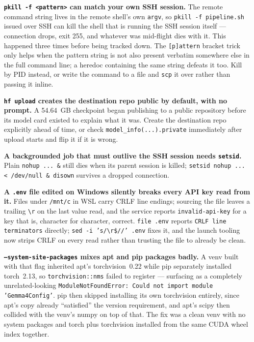 \documentclass[11pt]{article}
\begin{document}
\textbf{\texttt{pkill -f <pattern>} can match your own SSH session.} The remote
command string lives in the remote shell's own \texttt{argv}, so \texttt{pkill -f
pipeline.sh} issued over SSH can kill the shell that is running the SSH session itself
--- connection drops, exit 255, and whatever was mid-flight dies with it. This happened
three times before being tracked down. The \texttt{[p]attern} bracket trick only helps
when the pattern string is not also present verbatim somewhere else in the full command
line; a heredoc containing the same string defeats it too. Kill by PID instead, or write
the command to a file and \texttt{scp} it over rather than passing it inline.

\textbf{\texttt{hf upload} creates the destination repo public by default, with no
prompt.} A 54.64~GB checkpoint began publishing to a public repository before its model
card existed to explain what it was. Create the destination repo explicitly ahead of
time, or check \texttt{model\_info(...).private} immediately after upload starts and
flip it if it is wrong.

\textbf{A backgrounded job that must outlive the SSH session needs
\texttt{setsid}.} Plain \texttt{nohup ... \&} still dies when its parent session is
killed; \texttt{setsid nohup ... < /dev/null \& disown} survives a dropped connection.

\textbf{A \texttt{.env} file edited on Windows silently breaks every API key read from
it.} Files under \texttt{/mnt/c} in WSL carry CRLF line endings; sourcing the file
leaves a trailing \texttt{\textbackslash r} on the last value read, and the service
reports \texttt{invalid-api-key} for a key that is, character for character, correct.
\texttt{file .env} reports \texttt{CRLF line terminators} directly;
\texttt{sed -i 's/\textbackslash r\$//' .env} fixes it, and the launch tooling now
strips CRLF on every read rather than trusting the file to already be clean.

\textbf{\texttt{--system-site-packages} mixes apt and pip packages badly.} A venv
built with that flag inherited apt's torchvision~0.22 while pip separately installed
torch~2.13, so \texttt{torchvision::nms} failed to register --- surfacing as a
completely unrelated-looking \texttt{ModuleNotFoundError: Could not import module
'Gemma4Config'}. pip then skipped installing its own torchvision entirely, since apt's
copy already ``satisfied'' the version requirement, and apt's scipy then collided with
the venv's numpy on top of that. The fix was a clean venv with no system packages and
torch plus torchvision installed from the same CUDA wheel index together.
\end{document}
